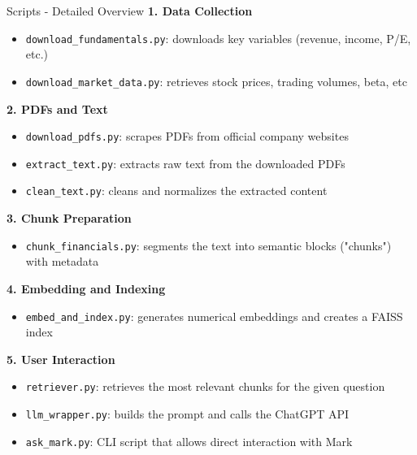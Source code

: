 \documentclass[aspectratio=169,xcolor=dvipsnames]{beamer}
\begin{document}
\begin{frame}{Scripts - Detailed Overview}
  \textbf{1. Data Collection}
  \begin{itemize}
      \item \texttt{download\_fundamentals.py}: downloads key variables (revenue, income, P/E, etc.)
      \item \texttt{download\_market\_data.py}: retrieves stock prices, trading volumes, beta, etc
  \end{itemize}
  
  \textbf{2. PDFs and Text}
  \begin{itemize}
      \item \texttt{download\_pdfs.py}: scrapes PDFs from official company websites
      \item \texttt{extract\_text.py}: extracts raw text from the downloaded PDFs
      \item \texttt{clean\_text.py}: cleans and normalizes the extracted content
  \end{itemize}
  
  \textbf{3. Chunk Preparation}
  \begin{itemize}
      \item \texttt{chunk\_financials.py}: segments the text into semantic blocks ("chunks") with metadata
  \end{itemize}
  
  \textbf{4. Embedding and Indexing}
  \begin{itemize}
      \item \texttt{embed\_and\_index.py}: generates numerical embeddings and creates a FAISS index
  \end{itemize}
  
  \textbf{5. User Interaction}
  \begin{itemize}
      \item \texttt{retriever.py}: retrieves the most relevant chunks for the given question
      \item \texttt{llm\_wrapper.py}: builds the prompt and calls the ChatGPT API
      \item \texttt{ask\_mark.py}: CLI script that allows direct interaction with Mark
  \end{itemize}
\end{frame}
\end{document}
